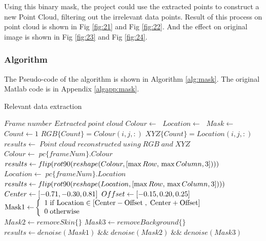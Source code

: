 \documentclass[10pt,a4paper]{article}
\begin{document}
Using this binary mask, the project could use the extracted points to construct a new Point Cloud, filtering out the irrelevant data points.
Result of this process on point cloud is shown in Fig \ref{fig:21} and Fig \ref{fig:22}.
And the effect on original image is shown in Fig \ref{fig:23} and Fig \ref{fig:24}.



\subsubsection{Algorithm}

The Pseudo-code of the algorithm is shown in Algorithm \ref{alg:mask}. 
The original Matlab code is in Appendix \ref{algapp:mask}.



     \begin{algorithm}  
	\caption{Relevant data extraction} 
     \label{alg:mask} 
	\begin{algorithmic}[1]  
		\Require $Frame\; number$ 
		\Ensure $Extracted\; point\; cloud$  
		\State $Colour \gets \;$
		\State $Location \gets \;$
		\State $Mask \gets \;$
		\State $Count \gets 1$
		\State $RGB\{Count\} = Colour(i,j,:)$
		\State $XYZ\{Count\} = Location(i,j,:)$
		\EndIf
		\EndFor
		\EndFor
		\State $results \gets \;Point \;cloud \;reconstructed \;using \;RGB \;and \;XYZ$
		\State {}  
		\EndFunction  
		\State $Colour \gets \; pc\{frameNum\}.Colour $  
		\State $results\gets flip(rot90(reshape(Colour,{\rm{ }}[\max Row,{\rm{ }}\max Column,{\rm{ }}3])))$  
		\State {}  
        \EndFunction  
        \State $Location \gets \; pc\{frameNum\}.Location $  
        \State $results\gets flip(rot90(reshape(Location,{\rm{ }}[\max Row,{\rm{ }}\max Column,{\rm{ }}3])))$  
        \State {}  
        \EndFunction  
        \State $Center \gets {\rm{[ - 0}}{\rm{.71, - 0}}{\rm{.30, 0}}{\rm{.81]}} $  
        \State $Offset \gets {\rm{[ - 0}}{\rm{.15, 0}}{\rm{.20, 0}}{\rm{.25]}}$  
        \State ${\rm{Mask1  \gets  }}\left\{ \begin{array}{l}
        1{\rm{\; if \; Location}} \in {\rm{[Center - Offset\;,\;Center + Offset]}}\\
        0{\rm{\; otherwise}}
        \end{array} \right.$  
        \State $Mask2  \gets removeSkin \{$$\} $
        \State $Mask3  \gets removeBackground \{$$\} $
        \State $results\gets denoise(Mask1)\; \&\& \;denoise(Mask2)\; \&\& \; denoise(Mask3)$        
        \State {}  
        \EndFunction        

	\end{algorithmic}  
\end{algorithm}  
\end{document}
